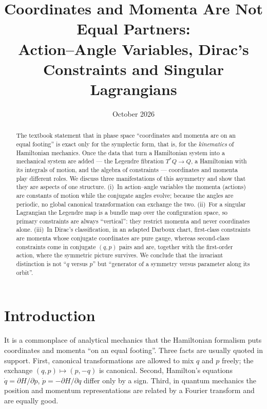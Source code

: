 \documentclass[11pt,a4paper]{article}
\title{Coordinates and Momenta Are Not Equal Partners:\\
Action--Angle Variables, Dirac's Constraints and Singular Lagrangians}
\author{}
\date{October 2026}
\theoremstyle{definition}
\theoremstyle{remark}
\begin{document}
\maketitle

\begin{abstract}
\noindent
The textbook statement that in phase space ``coordinates and momenta are on an equal footing'' is exact only for the symplectic form, that is, for the \emph{kinematics} of Hamiltonian mechanics. Once the data that turn a Hamiltonian system into a mechanical system are added --- the Legendre fibration $T^*Q\to Q$, a Hamiltonian with its integrals of motion, and the algebra of constraints --- coordinates and momenta play different roles. We discuss three manifestations of this asymmetry and show that they are aspects of one structure.
(i)~In action--angle variables the momenta (actions) are constants of motion while the conjugate angles evolve; because the angles are periodic, no global canonical transformation can exchange the two.
(ii)~For a singular Lagrangian the Legendre map is a bundle map over the configuration space, so primary constraints are always ``vertical'': they restrict momenta and never coordinates alone.
(iii)~In Dirac's classification, in an adapted Darboux chart, first-class constraints are momenta whose conjugate coordinates are pure gauge, whereas second-class constraints come in conjugate $(q,p)$ pairs and are, together with the first-order action, where the symmetric picture survives.
We conclude that the invariant distinction is not ``$q$ versus $p$'' but ``generator of a symmetry versus parameter along its orbit''.
\end{abstract}

\section{Introduction}

It is a commonplace of analytical mechanics that the Hamiltonian formalism puts coordinates and momenta ``on an equal footing''. Three facts are usually quoted in support. First, canonical transformations are allowed to mix $q$ and $p$ freely; the exchange $(q,p)\mapsto(p,-q)$ is canonical. Second, Hamilton's equations $\dot q=\partial H/\partial p$, $\dot p=-\partial H/\partial q$ differ only by a sign. Third, in quantum mechanics the position and momentum representations are related by a Fourier transform and are equally good.
\end{document}
